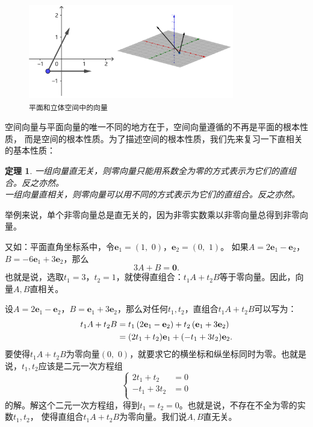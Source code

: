 \documentclass[12pt,UTF8]{ctexbook}
\newtheorem{tm}{定理}[section]
\begin{document}
\begin{figure}[h] 
    \centering
    \includegraphics[width=0.8\textwidth]{平面和空间向量1.png}
    \caption*{\texttt{平面和立体空间中的向量}}
\end{figure}

空间向量与平面向量的唯一不同的地方在于，空间向量遵循的不再是平面的根本性质，
而是空间的根本性质。为了描述空间的根本性质，我们先来复习一下直相关的基本性质：
\begin{tm}
    一组向量直无关，则零向量只能用系数全为零的方式表示为它们的直组合。反之亦然。\\
    一组向量直相关，则零向量可以用不同的方式表示为它们的直组合。反之亦然。
\end{tm}

举例来说，单个非零向量总是直无关的，因为非零实数乘以非零向量总得到非零向量。

又如：平面直角坐标系中，令$\mathbf{e}_1=(1,\,\,0)$，$\mathbf{e}_2=(0,\,\,1)$。
如果$A = 2\mathbf{e}_1 - \mathbf{e}_2$，$B = -6\mathbf{e}_1 + 3 \mathbf{e}_2$，那么
$$3A + B = \mathbf{0}.$$
也就是说，选取$t_1 = 3$，$t_2 = 1$，就使得直组合：$t_1A + t_2B$等于零向量。因此，向量$A, B$直相关。

设$A = 2\mathbf{e}_1 - \mathbf{e}_2$，$B = \mathbf{e}_1 + 3 \mathbf{e}_2$，那么对任何$t_1,t_2$，直组合$t_1A + t_2B$可以写为：
\begin{align}
t_1A + t_2B &= t_1 \left( 2\mathbf{e}_1 - \mathbf{e}_2 \right) + t_2 \left( \mathbf{e}_1 + 3 \mathbf{e}_2 \right) \notag \\
&= (2t_1 + t_2) \mathbf{e}_1 + (-t_1 + 3t_2)\mathbf{e}_2.\notag
\end{align}
要使得$t_1A + t_2B$为零向量$(0,\,\,0)$，就要求它的横坐标和纵坐标同时为零。也就是说，$t_1,t_2$应该是二元一次方程组
$$
\left\{
\begin{array}{cl}
  2t_1 + t_2 &= 0 \\
  -t_1 +3t_2 &= 0 \\
\end{array}
\right.
$$
的解。解这个二元一次方程组，得到$t_1=t_2=0$。也就是说，不存在不全为零的实数$t_1, t_2$，
使得直组合$t_1A + t_2B$为零向量。我们说$A, B$直无关。
\end{document}
